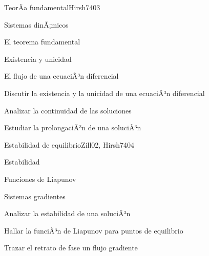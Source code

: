 \begin{syllabus}
\begin{unit}{TeorÃ­a fundamental}{Hirsh74}{0}{3}
\begin{topics}
      \item Sistemas dinÃ¡micos
      \item El teorema fundamental
      \item Existencia y unicidad
      \item El flujo de una ecuaciÃ³n diferencial
   \end{topics}

   \begin{learningoutcomes}
      \item Discutir la existencia y la unicidad de una ecuaciÃ³n diferencial
      \item Analizar la continuidad de las soluciones
      \item Estudiar la prolongaciÃ³n de una soluciÃ³n

   \end{learningoutcomes}
\end{unit}

\begin{unit}{Estabilidad de equilibrio}{Zill02, Hirsh74}{0}{4}
\begin{topics}
      \item Estabilidad
      \item Funciones de Liapunov
      \item Sistemas gradientes
   \end{topics}

   \begin{learningoutcomes}
      \item Analizar la estabilidad de una soluciÃ³n
      \item Hallar la funciÃ³n de Liapunov para puntos de  equilibrio
      \item Trazar el retrato de fase un flujo gradiente
    \end{learningoutcomes}
\end{unit}



\begin{coursebibliography}
\end{coursebibliography}

\end{syllabus}
